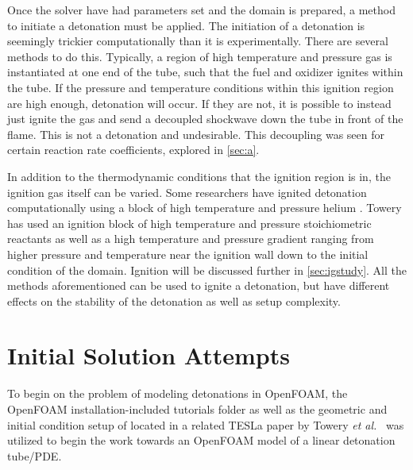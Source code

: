 Once the solver have had parameters set and the domain is prepared, a method to initiate a detonation must be applied. The initiation of a detonation is seemingly trickier computationally than it is experimentally. There are several methods to do this. Typically, a region of high temperature and pressure gas is instantiated at one end of the tube, such that the fuel and oxidizer ignites within the tube. If the pressure and temperature conditions within this ignition region are high enough, detonation will occur. If they are not, it is possible to instead just ignite the gas and send a decoupled shockwave down the tube in front of the flame. This is not a detonation and undesirable. This decoupling was seen for certain reaction rate coefficients, explored in \ref{sec:a}. 

In addition to the thermodynamic conditions that the ignition region is in, the ignition gas itself can be varied. Some researchers have ignited detonation computationally using a block of high temperature and pressure helium \cite{marcantoni}. Towery has used an ignition block of high temperature and pressure stoichiometric reactants \cite{towery1} as well as a high temperature and pressure gradient \cite{towery2} ranging from higher pressure and temperature near the ignition wall down to the initial condition of the domain. Ignition will be discussed further in \ref{sec:igstudy}. All the methods aforementioned can be used to ignite a detonation, but have different effects on the stability of the detonation as well as setup complexity. 





\section{Initial Solution Attempts}
To begin on the problem of modeling detonations in OpenFOAM, the OpenFOAM installation-included tutorials folder as well as the geometric and initial condition setup of located in a related TESLa paper by Towery \textit{et al.}~\cite{towery1} was utilized to begin the work towards an OpenFOAM model of a linear detonation tube/PDE.

